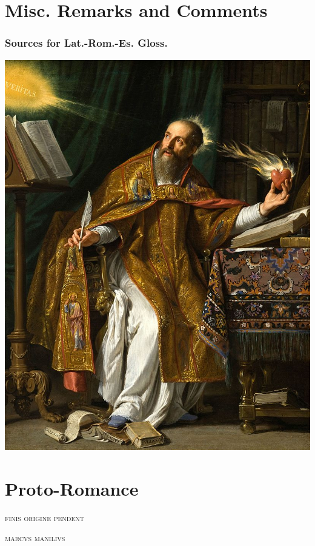 \documentclass{report}[12pt]
\begin{document}
\chapter*{Misc. Remarks and Comments}

\subsection*{Sources for Lat.-Rom.-Es. Gloss.}

\pagebreak

\includegraphics[scale=0.5]{augustine.jpg}

\thispagestyle{empty}

\pagebreak

\chapter{Proto-Romance}

\epigraph{\textsc{finis origine pendent}}{\textsc{marcvs manilivs}}
\end{document}
